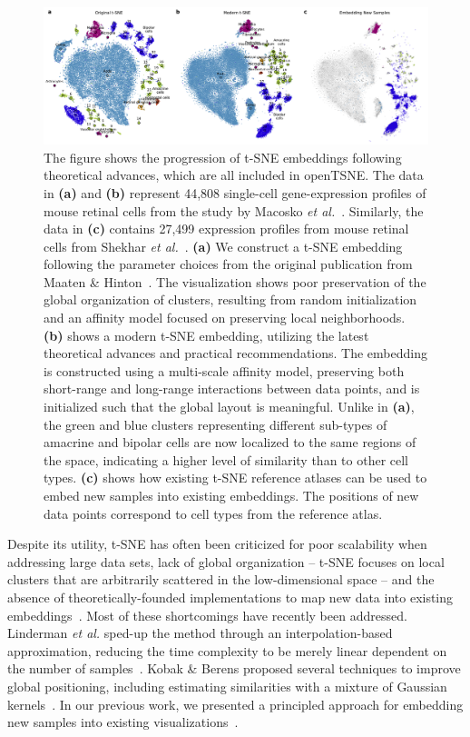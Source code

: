 \documentclass[twocolumn]{bmcart}
\newcommand{\opentsne}{\textsf{openTSNE}}
\begin{document}
\begin{figure}[htbp]
  \includegraphics[width=\textwidth]{macosko2015}
  \caption{\label{fig:macosko}The figure shows the progression of t-SNE
	embeddings following theoretical advances, which are all included in
	\opentsne. The data in \textbf{(a)} and \textbf{(b)} represent 44,808
	single-cell gene-expression profiles of mouse retinal cells from the
	study by Macosko \textit{et al.}~\cite{macosko2015highly}. Similarly,
	the data in \textbf{(c)} contains 27,499 expression profiles from mouse
	retinal cells from Shekhar \textit{et
	al.}~\cite{shekhar2016comprehensive}. \textbf{(a)} We construct a t-SNE
	embedding following the parameter choices from the original publication
	from Maaten \& Hinton~\cite{maaten2008visualizing}. The visualization
	shows poor preservation of the global organization of clusters,
	resulting from random initialization and an affinity model focused on
	preserving local neighborhoods. \textbf{(b)} shows a modern t-SNE
	embedding, utilizing the latest theoretical advances and practical
	recommendations. The embedding is constructed using a multi-scale
	affinity model, preserving both short-range and long-range interactions
	between data points, and is initialized such that the global layout is
	meaningful. Unlike in \textbf{(a)}, the green and blue clusters
	representing different sub-types of amacrine and bipolar cells are now
	localized to the same regions of the space, indicating a higher level
	of similarity than to other cell types. \textbf{(c)} shows how existing
	t-SNE reference atlases can be used to embed new samples into existing
	embeddings. The positions of new data points correspond to cell types
	from the reference atlas.}
\end{figure}

Despite its utility, t-SNE has often been criticized for poor scalability when
addressing large data sets, lack of global organization -- t-SNE focuses on
local clusters that are arbitrarily scattered in the low-dimensional space --
and the absence of theoretically-founded implementations to map new data into
existing embeddings~\cite{ding2018interpretable,becht2019dimensionality}. Most
of these shortcomings have recently been addressed. Linderman \textit{et al.}
sped-up the method through an interpolation-based approximation, reducing the
time complexity to be merely linear dependent on the number of
samples~\cite{linderman2019fast}. Kobak \& Berens proposed several techniques
to improve global positioning, including estimating similarities with a mixture
of Gaussian kernels~\cite{kobak2019art}. In our previous work, we presented a
principled approach for embedding new samples into existing
visualizations~\cite{policar2019embedding}.
\end{document}
